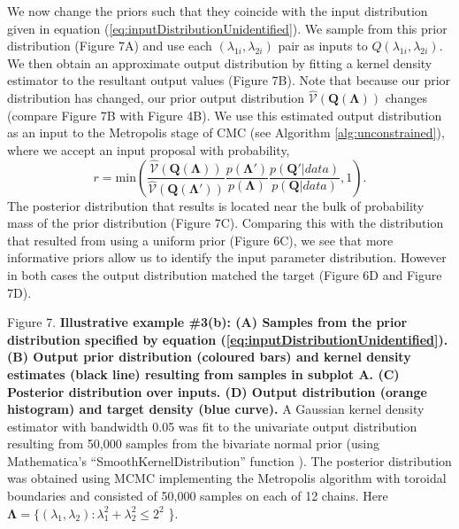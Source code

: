 \documentclass[10pt,letterpaper]{article}
\begin{document}
We now change the priors such that they coincide with the input distribution given in equation (\ref{eq:inputDistributionUnidentified}). We sample from this prior distribution (Figure 7A) and use each $(\lambda_{1i},\lambda_{2i})$ pair as inputs to $Q(\lambda_{1i},\lambda_{2i})$. We then obtain an approximate output distribution by fitting a kernel density estimator to the resultant output values (Figure 7B). Note that because our prior distribution has changed, our prior output distribution $\widehat{\mathcal{V}}(\boldsymbol{Q}(\boldsymbol{\Lambda}))$ changes (compare Figure 7B with Figure 4B). We use this estimated output distribution as an input to the Metropolis stage of CMC (see Algorithm \ref{alg:unconstrained}), where we accept an input proposal with probability,
%
\begin{equation}\label{eq:JacobianGeneral}
r = \text{min}\left(\frac{\widehat{\mathcal{V}}(\boldsymbol{Q}(\boldsymbol{\Lambda}))}{\widehat{\mathcal{V}}(\boldsymbol{Q}(\boldsymbol{\Lambda}'))} \frac{p(\boldsymbol{\Lambda}')}{p(\boldsymbol{\Lambda})} \frac{p(\boldsymbol{Q}'|data)}{p(\boldsymbol{Q}|data)},1\right).
\end{equation}
%
The posterior distribution that results is located near the bulk of probability mass of the prior distribution (Figure 7C). Comparing this with the distribution that resulted from using a uniform prior (Figure 6C), we see that more informative priors allow us to identify the input parameter distribution. However in both cases the output distribution matched the target (Figure 6D and Figure 7D).

\vspace{0.5cm}

Figure 7. \textbf{Illustrative example \#3(b): (A) Samples from the prior distribution specified by equation (\ref{eq:inputDistributionUnidentified}). (B) Output prior distribution (coloured bars) and kernel density estimates (black line) resulting from samples in subplot A. (C) Posterior distribution over inputs.  (D) Output distribution (orange histogram) and target density (blue curve).} A Gaussian kernel density estimator with bandwidth 0.05 was fit to the univariate output distribution resulting from 50,000 samples from the bivariate normal prior (using Mathematica's ``SmoothKernelDistribution'' function \cite{mathematica}). The posterior distribution was obtained using MCMC implementing the Metropolis algorithm with toroidal boundaries and consisted of 50,000 samples on each of 12 chains. Here $\boldsymbol{\Lambda} = \{ (\lambda_1,\lambda_2): \lambda_1^2+\lambda_2^2\leq2^2$ \}.
\end{document}

